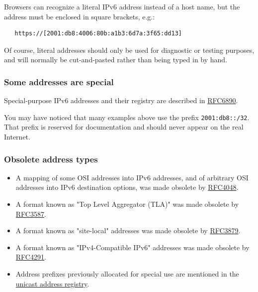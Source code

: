\documentclass[
]{article}
\begin{document}
Browsers can recognize a literal IPv6 address instead of a host name,
but the address must be enclosed in square brackets, e.g.:

\begin{verbatim}
   https://[2001:db8:4006:80b:a1b3:6d7a:3f65:dd13]
\end{verbatim}

Of course, literal addresses should only be used for diagnostic or
testing purposes, and will normally be cut-and-pasted rather than being
typed in by hand.

\subsubsection{Some addresses are
special}\label{some-addresses-are-special}

Special-purpose IPv6 addresses and their registry are described in
\href{https://www.rfc-editor.org/info/rfc6890}{RFC6890}.

You may have noticed that many examples above use the prefix
\texttt{2001:db8::/32}. That prefix is reserved for documentation and
should never appear on the real Internet.

\subsubsection{Obsolete address types}\label{obsolete-address-types}

\begin{itemize}
\item
  A mapping of some OSI addresses into IPv6 addresses, and of arbitrary
  OSI addresses into IPv6 destination options, was made obsolete by
  \href{https://www.rfc-editor.org/info/rfc4048}{RFC4048}.
\item
  A format known as "Top Level Aggregator (TLA)" was made obsolete by
  \href{https://www.rfc-editor.org/info/rfc3587}{RFC3587}.
\item
  A format known as "site-local" addresses was made obsolete by
  \href{https://www.rfc-editor.org/info/rfc3879}{RFC3879}.
\item
  A format known as "IPv4-Compatible IPv6" addresses was made obsolete
  by \href{https://www.rfc-editor.org/info/rfc4291}{RFC4291}.
\item
  Address prefixes previously allocated for special use are mentioned in
  the
  \href{https://www.iana.org/assignments/ipv6-unicast-address-assignments/ipv6-unicast-address-assignments.xhtml}{unicast
  address registry}.
\end{itemize}
\end{document}

